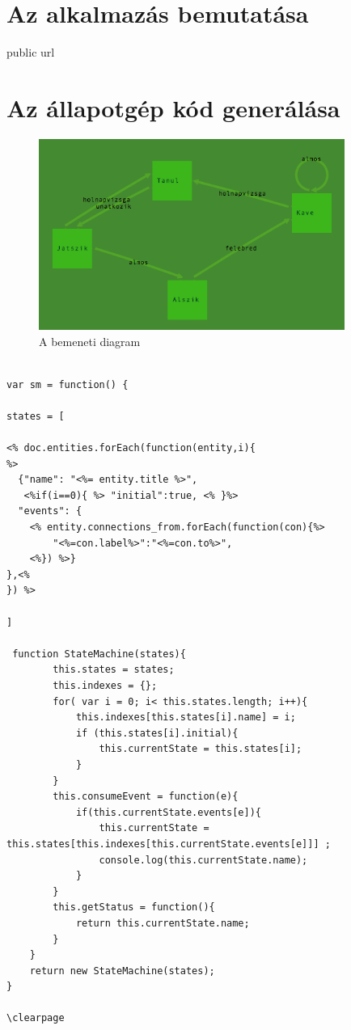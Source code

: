 \clearpage\section{Az alkalmazás bemutatása}

public url

\clearpage\section{Az állapotgép kód generálása}

\begin{figure}[!ht]
\centering
\includegraphics[width=100mm, keepaspectratio]{figures/tanulo.png}
\caption{A bemeneti diagram} 
\end{figure}


\begin{lstlisting}[caption=Az állapotgép kódgeneráló UnderscoreJS template-je]  

var sm = function() {

states = [

<% doc.entities.forEach(function(entity,i){
%>
  {"name": "<%= entity.title %>", 
   <%if(i==0){ %> "initial":true, <% }%>
  "events": {
    <% entity.connections_from.forEach(function(con){%>
        "<%=con.label%>":"<%=con.to%>",
    <%}) %>}
},<%
}) %>

]

 function StateMachine(states){
        this.states = states;
        this.indexes = {}; 
        for( var i = 0; i< this.states.length; i++){
            this.indexes[this.states[i].name] = i;
            if (this.states[i].initial){
                this.currentState = this.states[i];
            }
        }
        this.consumeEvent = function(e){
            if(this.currentState.events[e]){
                this.currentState = this.states[this.indexes[this.currentState.events[e]]] ;
                console.log(this.currentState.name);
            }
        }
        this.getStatus = function(){
            return this.currentState.name;
        }
    }
    return new StateMachine(states);
}

\clearpage

\end{lstlisting}



